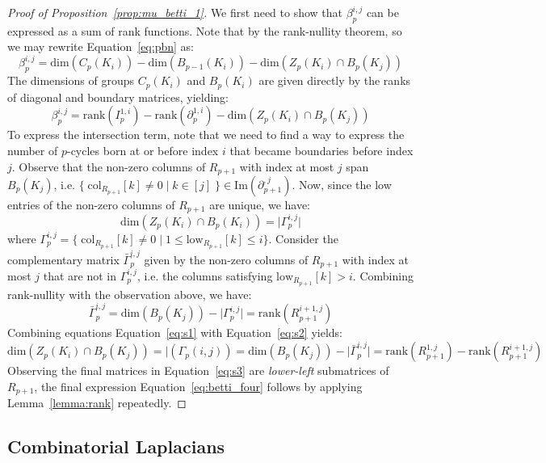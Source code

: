 \documentclass[pdflatex,sn-mathphys-num]{sn-jnl}
\begin{document}
\begin{appendices}
\begin{proof}[Proof of Proposition~\ref{prop:mu_betti_1}]\label{proof:mu_betti_1}
	\setlength{\abovedisplayskip}{1em}
	\setlength{\belowdisplayskip}{1em}
	We first need to show that $\beta_p^{i, j}$ can be expressed as a sum of rank functions. Note that by the rank-nullity theorem, so we may rewrite Equation~\ref{eq:pbn} as: 
	\[
	\beta_p^{i, j} = \mathrm{dim}(C_p (K_i)) - \mathrm{dim}(B_{p - 1} (K_i)) - \mathrm{dim}(Z_p (K_i) \cap B_p (K_j))
	\] 
	The dimensions of groups $C_p (K_i)$ and $B_p (K_i)$ are given directly by the ranks of diagonal and boundary matrices, yielding: 
	\begin{displaymath}
		\beta_p^{i, j} = \mathrm{rank}(I_p^{1, i}) - \mathrm{rank}(\partial_p^{1, i}) - \mathrm{dim}(Z_p (K_i) \cap  B_p (K_j)) 
	\end{displaymath}
	To express the intersection term, note that we need to find a way to express the number of $p$-cycles born at or before index $i$ that became boundaries before index $j$. 
	Observe that the non-zero columns of $R_{p+1}$ with index at most $j$ span $B_p (K_j)$, i.e. $\{\; \mathrm{col}_{R_{p+1}}[k] \neq 0 \mid k \in [j] \;\} \in \mathrm{Im}(\partial_{p+1}^{,j})$. 
	Now, since the low entries of the non-zero columns of $R_{p+1}$ are unique, we have: 
	\[\label{eq:s1}
	\mathrm{dim}(Z_p (K_i) \cap B_p (K_i)) = \lvert \Gamma_p^{i,j} \rvert 
	\]
	where $\Gamma_p^{i,j} = \{\; \mathrm{col}_{R_{p+1}}[k] \neq 0 \mid 1 \leq \mathrm{low}_{R_{p+1}} [k] \leq i \}$. Consider the complementary matrix $\bar{\Gamma}_p^{i,j}$ given by the non-zero columns of $R_{p+1}$ with index at most $j$ that are not in $\Gamma_p^{i,j}$, i.e. the columns satisfying $\mathrm{low}_{R_{p+1}}[k] > i$. Combining rank-nullity with the observation above, we have: 
	\[\label{eq:s2}
	\bar{\Gamma}_p^{i,j} = \mathrm{dim}(B_p (K_j)) - \lvert \Gamma_p^{i,j} \rvert = \mathrm{rank}(R_{p+1}^{i+1,j}) 
	\]
	Combining equations Equation~\ref{eq:s1} with Equation~\ref{eq:s2} yields:
	\[\label{eq:s3}
	\mathrm{dim}(Z_p(K_i) \cap B_p(K_j)) = \lvert( \Gamma_p(i,j)) = \mathrm{dim}(B_p (K_j)) - \lvert \bar{\Gamma}_p^{i,j} \rvert  = \mathrm{rank}(R_{p+1}^{1,j}) - \mathrm{rank}(R_{p+1}^{i+1,j}) 
	\]
	\noindent Observing the final matrices in Equation~\ref{eq:s3} are \emph{lower-left} submatrices of $R_{p+1}$, the final expression Equation~\ref{eq:betti_four} follows by applying Lemma~\ref{lemma:rank} repeatedly. 
\end{proof}


\subsection{Combinatorial Laplacians}\label{sec:laplacian_theory}


\end{appendices}
\end{document}
